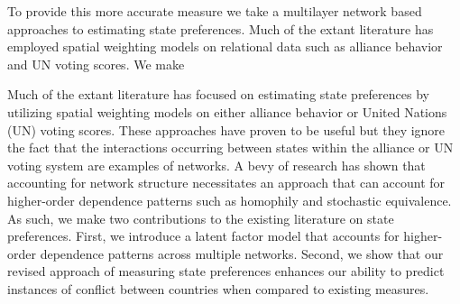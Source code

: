 To provide this more accurate measure we take a multilayer network based approaches to estimating state preferences. Much of the extant literature has employed spatial weighting models \citep{signorino:ritter:1999,bailey:etal:2015} on relational data such as alliance behavior and UN voting scores. We make 

Much of the extant literature has focused on estimating state preferences by utilizing spatial weighting models on either alliance behavior or United Nations (UN) voting scores. These approaches have proven to be useful but they ignore the fact that the interactions occurring between states within the alliance or UN voting system are examples of networks. A bevy of research has shown that accounting for network structure necessitates an approach that can account for higher-order dependence patterns such as homophily and stochastic equivalence. As such, we make two contributions to the existing literature on state preferences. First, we introduce a latent factor model that accounts for higher-order dependence patterns across multiple networks. Second, we show that our revised approach of measuring state preferences enhances our ability to predict instances of conflict between countries when compared to existing measures.
